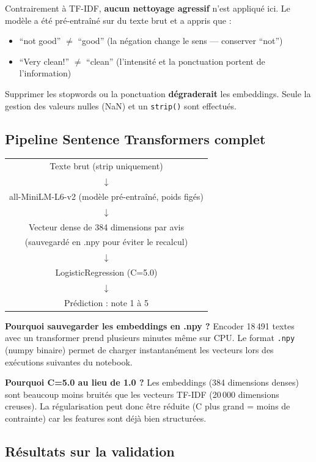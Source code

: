 \documentclass[12pt, a4paper]{article}
\begin{document}
Contrairement à TF-IDF, \textbf{aucun nettoyage agressif} n'est appliqué ici.
Le modèle a été pré-entraîné sur du texte brut et a appris que :
\begin{itemize}
  \item ``not good'' $\neq$ ``good'' (la négation change le sens — conserver ``not'')
  \item ``Very clean!'' $\neq$ ``clean'' (l'intensité et la ponctuation portent de l'information)
\end{itemize}
Supprimer les stopwords ou la ponctuation \textbf{dégraderait} les embeddings.
Seule la gestion des valeurs nulles (NaN) et un \texttt{strip()} sont effectués.

\subsection{Pipeline Sentence Transformers complet}

\begin{center}
\ttfamily\small
\begin{tabular}{c}
Texte brut (strip uniquement) \\
$\downarrow$ \\
all-MiniLM-L6-v2 (modèle pré-entraîné, poids figés) \\
$\downarrow$ \\
Vecteur dense de 384 dimensions par avis \\
(sauvegardé en .npy pour éviter le recalcul) \\
$\downarrow$ \\
LogisticRegression (C=5.0) \\
$\downarrow$ \\
Prédiction : note 1 à 5 \\
\end{tabular}
\end{center}

\textbf{Pourquoi sauvegarder les embeddings en .npy ?}
Encoder 18\,491 textes avec un transformer prend plusieurs minutes même sur CPU.
Le format \texttt{.npy} (numpy binaire) permet de charger instantanément les vecteurs
lors des exécutions suivantes du notebook.

\textbf{Pourquoi C=5.0 au lieu de 1.0 ?}
Les embeddings (384 dimensions denses) sont beaucoup moins bruités que les vecteurs
TF-IDF (20\,000 dimensions creuses). La régularisation peut donc être réduite
(C plus grand = moins de contrainte) car les features sont déjà bien structurées.

\subsection{Résultats sur la validation}
\end{document}
